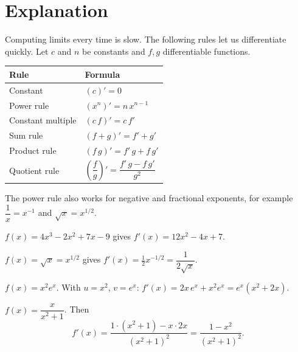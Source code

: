 \label{ch:rules}

\section*{Explanation}
Computing limits every time is slow. The following rules let us differentiate quickly. Let $c$ and $n$ be constants and $f,g$ differentiable functions.

\begin{center}
\renewcommand{\arraystretch}{1.8}
\begin{tabular}{ll}
\textbf{Rule} & \textbf{Formula}\\\hline
Constant & $(c)'=0$\\
Power rule & $(x^n)'=n\,x^{n-1}$\\
Constant multiple & $(c\,f)'=c\,f'$\\
Sum rule & $(f+g)'=f'+g'$\\
Product rule & $(f\,g)'=f'\,g+f\,g'$\\
Quotient rule & $\left(\dfrac{f}{g}\right)'=\dfrac{f'\,g-f\,g'}{g^2}$
\end{tabular}
\end{center}

The power rule also works for negative and fractional exponents, for example $\dfrac1x=x^{-1}$ and $\sqrt{x}=x^{1/2}$.

\begin{example}
$f(x)=4x^3-2x^2+7x-9$ gives $f'(x)=12x^2-4x+7$.
\end{example}

\begin{example}
$f(x)=\sqrt{x}=x^{1/2}$ gives $f'(x)=\tfrac12 x^{-1/2}=\dfrac{1}{2\sqrt{x}}$.
\end{example}

\begin{example}
$f(x)=x^2e^x$. With $u=x^2$, $v=e^x$: $f'(x)=2x\,e^x+x^2e^x=e^x(x^2+2x)$.
\end{example}

\begin{example}
$f(x)=\dfrac{x}{x^2+1}$. Then
\[
f'(x)=\frac{1\cdot(x^2+1)-x\cdot 2x}{(x^2+1)^2}=\frac{1-x^2}{(x^2+1)^2}.
\]
\end{example}

